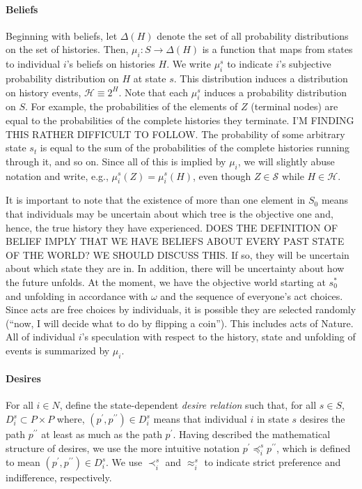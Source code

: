 \documentclass[
11pt,
titlepage,
reqno,
]{article}%
\theoremstyle{definition}
\begin{document}
	\paragraph*{Beliefs \label{para: beliefs}}
	Beginning with beliefs, let $\Delta(H)$ denote the set of all probability distributions on the set of histories. 
	Then,  $\mu_i:S\rightarrow \Delta(H)$ is a function that maps from states to individual $i$'s beliefs on histories $H$. 
	We write  $\mu_i^s$ to indicate $i$'s subjective probability distribution on $H$ at state $s$.
	This distribution induces a distribution on history events, $\mathcal{H}\equiv 2^H$. 
	Note that each $\mu_i^s$ induces a probability distribution on $S$.
	For example, the probabilities of the elements of $Z$ (terminal nodes) are equal to the probabilities of the complete histories they terminate. 
	I'M FINDING THIS RATHER DIFFICULT TO FOLLOW. 
	The probability of some arbitrary state $s_t$ is equal to the sum of the probabilities of the complete histories running through it, and so on.
	Since all of this is implied by $\mu_i$, we will slightly abuse notation and write, e.g.,  $\mu_i^s(Z)=\mu_i^s(H)$, even though $Z\in \mathcal{S}$ while $H\in \mathcal{H}$.
	
	It is important to note that the existence of more than one element in $S_0$ means that individuals may be uncertain about which tree is the objective one and, hence, the true history they have experienced. 
	DOES THE DEFINITION OF BELIEF IMPLY THAT WE HAVE BELIEFS ABOUT EVERY PAST STATE OF THE WORLD? WE SHOULD DISCUSS THIS.
	If so, they will be uncertain about which state they are in. 
	In addition, there will be uncertainty about how the future unfolds. 
	At the moment, we have the objective world starting at $s_0^\ast$ and unfolding in accordance with $\omega$ and the sequence of everyone's act choices. 
	Since  acts are free choices by individuals, it is possible they are selected randomly (``now, I will decide what to do by flipping a coin'').
	This includes acts of Nature.
	All of individual $i$'s speculation with respect to the history, state and unfolding of events is summarized by $\mu_i$.
	
	\paragraph*{Desires \label{para: desires}}
	For all $i\in N$, define the state-dependent \textit{desire relation} such that, for all $s\in S$,   $D_i^s\subset P\times P$ where, $(p^\prime,p^{\prime\prime})\in D_i^s$ means that  individual $i$ in state $s$ desires the path $p^{\prime\prime}$ at least as much as the path $p^\prime$. 
	Having described the mathematical structure of desires, we use the more intuitive notation $p^\prime\preceq_i^s p^{\prime\prime}$, which is defined to mean $(p^\prime,p^{\prime\prime})\in D_i^s$. 
	We use $\prec_i^s$ and $\approx_i^s$ to indicate strict preference and indifference, respectively. 
	
\end{document}

